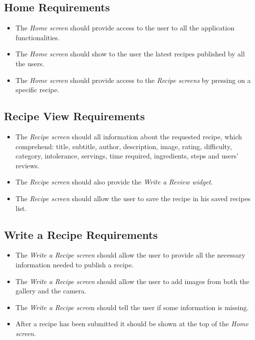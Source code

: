 	\subsection{Home Requirements}
		\begin{itemize}
			\item The \textit{Home screen} should provide access to the user to all the application functionalities.
			\item The \textit{Home screen} should show to the user the latest recipes published by all the users.
			\item The \textit{Home screen} should provide access to the \textit{Recipe screens} by pressing on a specific recipe.
		\end{itemize}

	\subsection{Recipe View Requirements}
	\begin{itemize}
		\item The \textit{Recipe screen} should all information about the requested recipe, which comprehend: title, subtitle, author, description, image, rating, difficulty, category, intolerance, servings, time required, ingredients, steps and users' reviews.
		\item The \textit{Recipe screen} should also provide the \textit{Write a Review widget}.
		\item The \textit{Recipe screen} should allow the user to save the recipe in his saved recipes list.
	\end{itemize}

	\subsection{Write a Recipe Requirements}
		\begin{itemize}
			\item The \textit{Write a Recipe screen} should allow the user to provide all the necessary information needed to publish a recipe.
			\item The \textit{Write a Recipe screen} should allow the user to add images from both the gallery and the camera.
			\item The \textit{Write a Recipe scree}n should tell the user if some information is missing.
			\item After a recipe has been submitted it should be shown at the top of the \textit{Home screen}.
		\end{itemize}

